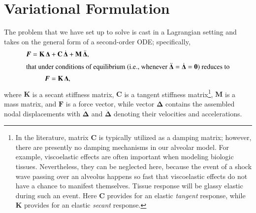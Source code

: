 \section{Variational Formulation}
\label{partVariational}

The problem that we have set up to solve is cast in a Lagrangian setting and takes on the general form of a second-order ODE; specifically,
\begin{subequations}
    \label{FEsysOfEqns}
    \begin{gather}
    \boldsymbol{F} =
    \mathbf{K} \, \boldsymbol{\Delta} + 
    \mathbf{C} \, \dot{\boldsymbol{\Delta}} +
    \mathbf{M} \, \ddot{\boldsymbol{\Delta}}, \\
    \intertext{that under conditions of equilibrium (i.e., whenever $\ddot{\boldsymbol{\Delta}} = \dot{\boldsymbol{\Delta}} = \mathbf{0}$) reduces to}
    \boldsymbol{F} = \mathbf{K} \, \boldsymbol{\Delta},
    \end{gather}
\end{subequations}
where $\mathbf{K}$ is a secant stiffness matrix, $\mathbf{C}$ is a tangent stiffness matrix\footnote{\footnotesize 
    In the literature, matrix $\mathbf{C}$ is typically utilized as a damping matrix; however, there are presently no damping mechanisms in our alveolar model.  For example, visco\-elastic effects are often important when modeling biologic tissues.  Nevertheless, they can be neglected here, because the event of a shock wave passing over an alveolus happens so fast that visco\-elastic effects do not have a chance to manifest themselves.  Tissue response will be glassy elastic during such an event.  Here $\mathbf{C}$ provides for an elastic \textit{tangent\/} response, while $\mathbf{K}$ provides for an elastic \textit{secant\/} response. 
},
$\mathbf{M}$ is a mass matrix, and $\boldsymbol{F}$ is a force vector, while vector $\boldsymbol{\Delta}$ contains the assembled nodal displacements with $\dot{\boldsymbol{\Delta}}$ and $\ddot{\boldsymbol{\Delta}}$ denoting their velocities and accelerations.

